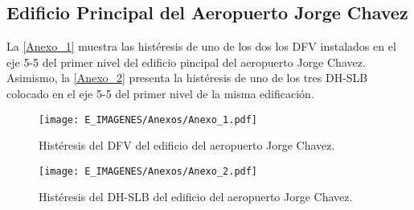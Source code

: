 \subsection*{Edificio Principal del Aeropuerto Jorge Chavez}
{}

La \autoref{Anexo_1} muestra las histéresis de uno de los dos los DFV instalados en el eje 5-5 del primer nivel del edificio pincipal del aeropuerto Jorge Chavez. Asimismo, la \autoref{Anexo_2} presenta la histéresis de uno de los tres DH-SLB colocado en el eje 5-5 del primer nivel de la misma edificación.


	\begin{figure}[!h]
	\centering
	\texttt{[image: E\_IMAGENES/Anexos/Anexo\_1.pdf]}
	\vspace{-8 mm}
	\caption[]{\centering\footnotesize Histéresis del DFV del edificio del aeropuerto Jorge Chavez.}
	\label{Anexo_1}
	\end{figure}	


	\begin{figure}[!h]
	\centering
	\texttt{[image: E\_IMAGENES/Anexos/Anexo\_2.pdf]}
	\vspace{-8 mm}
	\caption[]{\centering\footnotesize Histéresis del DH-SLB del edificio del aeropuerto Jorge Chavez.}
	\label{Anexo_2}
	\end{figure}	
